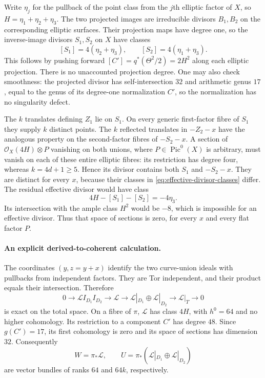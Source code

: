 \documentclass[11pt]{article}
\theoremstyle{definition}
\theoremstyle{remark}
\begin{document}
Write $\eta_j$ for the pullback of the point class from the $j$th
elliptic factor of $X$, so $H=\eta_1+\eta_2+\eta_3$.
The two projected images are irreducible divisors $B_1,B_2$ on
the corresponding elliptic surfaces. Their projection maps have
degree one, so the inverse-image divisors $S_1,S_2$ on $X$
have classes
\begin{equation}\label{eq:effective-divisor-classes}
 [S_1]=4(\eta_2+\eta_3),\qquad
 [S_2]=4(\eta_1+\eta_3).                                  
\end{equation}
This follows by pushing forward
$[C']=q^*(\Theta^2/2)=2H^2$ along each elliptic projection.
There is no unaccounted projection degree. One may also check
smoothness: the projected divisor has self-intersection $32$ and
arithmetic genus $17$, equal to the genus of its degree-one
normalization $C'$, so the normalization has no singularity defect.

The $k$ translates defining $Z_1$ lie on $S_1$. On every generic
first-factor fibre of $S_1$ they supply $k$ distinct points.
The $k$ reflected translates in $-Z_2-x$ have the analogous
property on the second-factor fibres of $-S_2-x$. A section of
$\mathcal O_X(4H)\otimes P$ vanishing on both unions, where
$P\in\operatorname{Pic}^0(X)$ is arbitrary, must vanish on each
of these entire elliptic fibres: its restriction has degree four,
whereas $k=4d+1\ge5$. Hence its divisor contains both $S_1$ and
$-S_2-x$. They are distinct for every $x$, because their classes
in \eqref{eq:effective-divisor-classes} differ. The residual effective divisor would have class
\[
 4H-[S_1]-[S_2]=-4\eta_3.
\]
Its intersection with the ample class $H^2$ would be $-8$, which
is impossible for an effective divisor. Thus that space of
sections is zero, for every $x$ and every flat factor $P$.

\paragraph{An explicit derived-to-coherent calculation.}
The coordinates $(y,z=y+x)$ identify the two curve-union ideals
with pullbacks from independent factors. They are Tor independent,
and their product equals their intersection. Therefore
\begin{equation}\label{eq:effective-ideal-sequence}
 0\to\mathcal L I_{D_1}I_{D_2}\to\mathcal L
 \to\mathcal L|_{D_1}\oplus\mathcal L|_{D_2}
 \to\mathcal L|_T\to0                                    
\end{equation}
is exact on the total space.
On a fibre of $\pi$, $\mathcal L$ has class $4H$, with
$h^0=64$ and no higher cohomology. Its restriction to a component
$C'$ has degree $48$. Since $g(C')=17$, its first cohomology is zero
and its space of sections has dimension $32$. Consequently
\[
 W=\pi_*\mathcal L,\qquad
 U=\pi_*(\mathcal L|_{D_1}\oplus\mathcal L|_{D_2})
\]
are vector bundles of ranks $64$ and $64k$, respectively.
\end{document}
